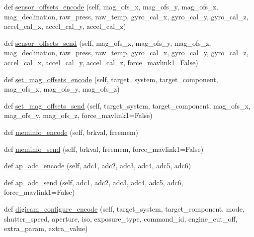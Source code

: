 \begin{DoxyCompactItemize}
def \hyperlink{classpymavlink_1_1dialects_1_1v10_1_1MAVLink_a7de2499e86948f67fa355f4af4a56b7c}{sensor\+\_\+offsets\+\_\+encode} (self, mag\+\_\+ofs\+\_\+x, mag\+\_\+ofs\+\_\+y, mag\+\_\+ofs\+\_\+z, mag\+\_\+declination, raw\+\_\+press, raw\+\_\+temp, gyro\+\_\+cal\+\_\+x, gyro\+\_\+cal\+\_\+y, gyro\+\_\+cal\+\_\+z, accel\+\_\+cal\+\_\+x, accel\+\_\+cal\+\_\+y, accel\+\_\+cal\+\_\+z)
\item 
def \hyperlink{classpymavlink_1_1dialects_1_1v10_1_1MAVLink_ae1ec375518e212663f29cb18fac40fb0}{sensor\+\_\+offsets\+\_\+send} (self, mag\+\_\+ofs\+\_\+x, mag\+\_\+ofs\+\_\+y, mag\+\_\+ofs\+\_\+z, mag\+\_\+declination, raw\+\_\+press, raw\+\_\+temp, gyro\+\_\+cal\+\_\+x, gyro\+\_\+cal\+\_\+y, gyro\+\_\+cal\+\_\+z, accel\+\_\+cal\+\_\+x, accel\+\_\+cal\+\_\+y, accel\+\_\+cal\+\_\+z, force\+\_\+mavlink1=False)
\item 
def \hyperlink{classpymavlink_1_1dialects_1_1v10_1_1MAVLink_abedd948825bfefedce2c5b32b905ba22}{set\+\_\+mag\+\_\+offsets\+\_\+encode} (self, target\+\_\+system, target\+\_\+component, mag\+\_\+ofs\+\_\+x, mag\+\_\+ofs\+\_\+y, mag\+\_\+ofs\+\_\+z)
\item 
def \hyperlink{classpymavlink_1_1dialects_1_1v10_1_1MAVLink_a81ec1e7917f4024ea60b66c5ee69411e}{set\+\_\+mag\+\_\+offsets\+\_\+send} (self, target\+\_\+system, target\+\_\+component, mag\+\_\+ofs\+\_\+x, mag\+\_\+ofs\+\_\+y, mag\+\_\+ofs\+\_\+z, force\+\_\+mavlink1=False)
\item 
def \hyperlink{classpymavlink_1_1dialects_1_1v10_1_1MAVLink_a74f5524f5864db80a209b6c30eb43f05}{meminfo\+\_\+encode} (self, brkval, freemem)
\item 
def \hyperlink{classpymavlink_1_1dialects_1_1v10_1_1MAVLink_a584f373180570115312d3e2bcc21f5f3}{meminfo\+\_\+send} (self, brkval, freemem, force\+\_\+mavlink1=False)
\item 
def \hyperlink{classpymavlink_1_1dialects_1_1v10_1_1MAVLink_ab1957fe0b14bfbdd98bec93a8e3f4a69}{ap\+\_\+adc\+\_\+encode} (self, adc1, adc2, adc3, adc4, adc5, adc6)
\item 
def \hyperlink{classpymavlink_1_1dialects_1_1v10_1_1MAVLink_a4d9052e1d2adb7e28863d72214dc6c43}{ap\+\_\+adc\+\_\+send} (self, adc1, adc2, adc3, adc4, adc5, adc6, force\+\_\+mavlink1=False)
\item 
def \hyperlink{classpymavlink_1_1dialects_1_1v10_1_1MAVLink_a3ec77b173cbcf07e4d56f7e3bdbdfeff}{digicam\+\_\+configure\+\_\+encode} (self, target\+\_\+system, target\+\_\+component, mode, shutter\+\_\+speed, aperture, iso, exposure\+\_\+type, command\+\_\+id, engine\+\_\+cut\+\_\+off, extra\+\_\+param, extra\+\_\+value)

\end{DoxyCompactItemize}
